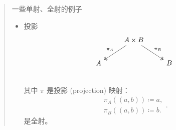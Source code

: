 \begin{quote}{一些单射、全射的例子}
    \begin{itemize}
        \item 投影
              \[
                  \begin{tikzcd}
                      {} & A\times B\arrow[rd, "\pi_B", two heads]\arrow[ld, "\pi_A"', two heads] & {} \\
                      A  & {}                                                                     & B  \\
                  \end{tikzcd}
              \]
              其中 \(\pi \) 是投影 (projection) 映射：
              \[
                  \begin{aligned}
                      \pi _A((a,b)) \coloneqq a , \\
                      \pi _B((a,b))\coloneqq b.
                  \end{aligned}
                  .\]
              是全射。


\end{itemize}
\end{quote}
